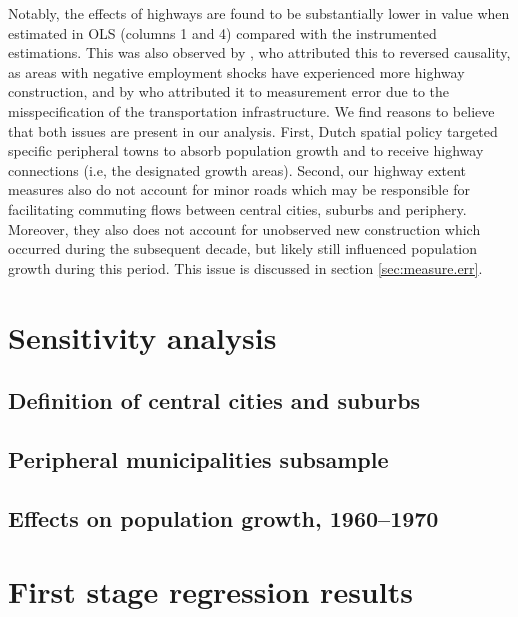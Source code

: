 \documentclass[a4paper,authoryear,review]{elsarticle}  	%
\begin{document}
	Notably, the effects of highways are found to be substantially lower in value when estimated in OLS (columns 1 and 4) compared with the instrumented estimations. This was also observed by \citet{Duranton2012b}, who attributed this to reversed causality, as areas with negative employment shocks have experienced more highway construction, and by \citet{Baum-Snow2007} who attributed it to measurement error due to the misspecification of the transportation infrastructure. 
	We find reasons to believe that both issues are present in our analysis. First, Dutch spatial policy targeted specific peripheral towns to absorb population growth and to receive highway connections (i.e, the designated growth areas). Second, our highway extent measures also do not account for minor roads which may be responsible for facilitating commuting flows between central cities, suburbs and periphery. Moreover, they also does not account for unobserved new construction which occurred during the subsequent decade, but likely still influenced population growth during this period. This issue is discussed in section \ref{sec:measure.err}.
	

\section[Appendix D]{Sensitivity analysis}\label{appc}
\subsection{Definition of central cities and suburbs}\label{appc.1}
		
	
	

\newpage	
\subsection{Peripheral municipalities subsample}\label{appc.2}		
		

\newpage
\subsection{Effects on population growth, 1960--1970}\label{appc.3}
% 
	

\newpage	
\section[Appendix D]{First stage regression results}\label{appd}	
	
\end{document}
